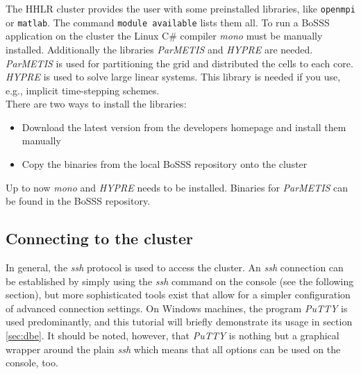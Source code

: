 \documentclass[11pt,twoside,a4paper]{fdyartcl}
\begin{document}
The HHLR cluster provides the user with some preinstalled libraries, like \verb|openmpi| or \verb|matlab|. The command \verb|module available|  lists them all. To run a BoSSS application on the cluster the Linux C\# compiler \emph{mono} must be manually installed. Additionally the libraries \emph{ParMETIS} and \emph{HYPRE} are needed. \emph{ParMETIS} is used for partitioning the grid and distributed the cells to each core. \emph{HYPRE} is used to solve large linear systems. This library is needed if you use, e.g., implicit time-stepping schemes.\\
There are two ways to install the libraries:
\begin{itemize}
\item Download the latest version from the developers homepage and install them manually
\item Copy the binaries from the local BoSSS repository onto the cluster 
\end{itemize}
Up to now \emph{mono} and \emph{HYPRE} needs to be installed. Binaries for \emph{ParMETIS} can be found in the BoSSS repository.

\subsection{Connecting to the cluster}
\label{sec:putty}
In general, the \emph{ssh} protocol is used to access the cluster. An \emph{ssh} connection can be established by simply using the \emph{ssh} command on the console (see the following section), but more sophisticated tools exist that allow for a simpler configuration of advanced connection settings. On Windows machines, the program \emph{PuTTY} is used predominantly, and this tutorial will briefly demonstrate its usage in section \ref{sec:dbe}. It should be noted, however, that \emph{PuTTY} is nothing but a graphical wrapper around the plain \emph{ssh} which means that all options can be used on the console, too.
\end{document}
